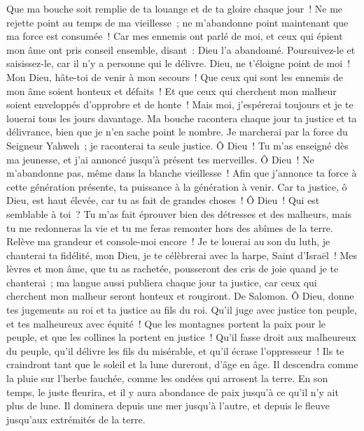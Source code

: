 \begin{multicols}{2}
Que ma bouche soit remplie de ta louange et de ta gloire chaque jour~!
Ne me rejette point au temps de ma vieillesse~; ne m'abandonne point maintenant que ma force est consumée~!
Car mes ennemis ont parlé de moi, et ceux qui épient mon âme ont pris conseil ensemble,
disant~: Dieu l'a abandonné. Poursuivez-le et saisissez-le, car il n'y a personne qui le délivre.
Dieu, ne t'éloigne point de moi~! Mon Dieu, hâte-toi de venir à mon secours~!
Que ceux qui sont les ennemis de mon âme soient honteux et défaits~! Et que ceux qui cherchent mon malheur soient enveloppés d'opprobre et de honte~!
Mais moi, j'espérerai toujours et je te louerai tous les jours davantage.
Ma bouche racontera chaque jour ta justice et ta délivrance, bien que je n'en sache point le nombre.
Je marcherai par la force du Seigneur Yahweh~; je raconterai ta seule justice.
Ô Dieu~! Tu m'as enseigné dès ma jeunesse, et j'ai annoncé jusqu'à présent tes merveilles.
Ô Dieu~! Ne m'abandonne pas, même dans la blanche vieillesse~! Afin que j'annonce ta force à cette génération présente, ta puissance à la génération à venir.
Car ta justice, ô Dieu, est haut élevée, car tu as fait de grandes choses~! Ô Dieu~! Qui est semblable à toi~?
Tu m'as fait éprouver bien des détresses et des malheurs, mais tu me redonneras la vie et tu me feras remonter hors des abîmes de la terre.
Relève ma grandeur et console-moi encore~!
Je te louerai au son du luth, je chanterai ta fidélité, mon Dieu, je te célèbrerai avec la harpe, Saint d'Israël~!
Mes lèvres et mon âme, que tu as rachetée, pousseront des cris de joie quand je te chanterai~;
ma langue aussi publiera chaque jour ta justice, car ceux qui cherchent mon malheur seront honteux et rougiront.
\VerseOne{}De Salomon. Ô Dieu, donne tes jugements au roi et ta justice au fils du roi.
Qu'il juge avec justice ton peuple, et tes malheureux avec équité~!
Que les montagnes portent la paix pour le peuple, et que les collines la portent en justice~!
Qu'il fasse droit aux malheureux du peuple, qu'il délivre les fils du misérable, et qu'il écrase l'oppresseur~!
Ils te craindront tant que le soleil et la lune dureront, d'âge en âge.
Il descendra comme la pluie sur l'herbe fauchée, comme les ondées qui arrosent la terre.
En son temps, le juste fleurira, et il y aura abondance de paix jusqu'à ce qu'il n'y ait plus de lune.
Il dominera depuis une mer jusqu'à l'autre, et depuis le fleuve jusqu'aux extrémités de la terre.

\end{multicols}
